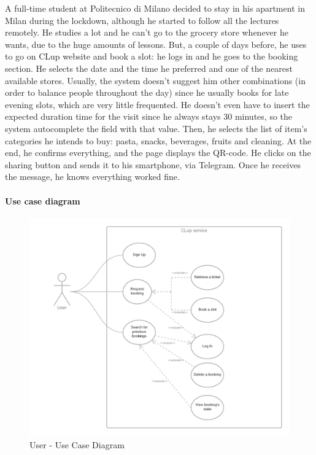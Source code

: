 \documentclass[table, 12pt]{article}
\begin{document}
A full-time student at Politecnico di Milano decided to stay in his apartment in Milan during the lockdown, although he started to follow all the lectures remotely. He studies a lot and he can't go to the grocery store whenever he wants, due to the huge amounts of lessons. But, a couple of days before, he uses to go on CLup website and book a slot: he logs in and he goes to the booking section. He selects the date and the time he preferred and one of the nearest available stores. Usually, the system doesn't suggest him other combinations (in order to balance people throughout the day) since he usually books for late evening slots, which are very little frequented. He doesn't even have to insert the expected duration time for the visit since he always stays 30 minutes, so the system autocomplete the field with that value. Then, he selects the list of item's categories he intends to buy: pasta, snacks, beverages, fruits and cleaning. At the end, he confirms everything, and the page displays the QR-code. He clicks on the sharing button and sends it to his smartphone, via Telegram. Once he receives the message, he knows everything worked fine.\\



\paragraph{Use case diagram}
\begin{figure}[H]
    \begin{center}
        \includegraphics[width=\textwidth]{assets/Use-Case-Diagrams/use_case_diagram_user.png}
        \caption{User - Use Case Diagram}
    \end{center}
\end{figure}
\end{document}
